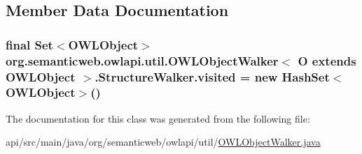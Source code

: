 \subsection{Member Data Documentation}
\hypertarget{classorg_1_1semanticweb_1_1owlapi_1_1util_1_1_o_w_l_object_walker_3_01_o_01extends_01_o_w_l_object_01_4_1_1_structure_walker_ae63c2640e51958755da407a34ec4a79d}{
\subsubsection[{visited}]{\setlength{\rightskip}{0pt plus 5cm}final Set$<${\bf O\-W\-L\-Object}$>$ org.\-semanticweb.\-owlapi.\-util.\-O\-W\-L\-Object\-Walker$<$ O extends {\bf O\-W\-L\-Object} $>$.Structure\-Walker.\-visited = new Hash\-Set$<${\bf O\-W\-L\-Object}$>$()\hspace{0.3cm}{\ttfamily [private]}}}\label{classorg_1_1semanticweb_1_1owlapi_1_1util_1_1_o_w_l_object_walker_3_01_o_01extends_01_o_w_l_object_01_4_1_1_structure_walker_ae63c2640e51958755da407a34ec4a79d}


The documentation for this class was generated from the following file\-:\begin{DoxyCompactItemize}
\item 
api/src/main/java/org/semanticweb/owlapi/util/\hyperlink{_o_w_l_object_walker_8java}{O\-W\-L\-Object\-Walker.\-java}\end{DoxyCompactItemize}
